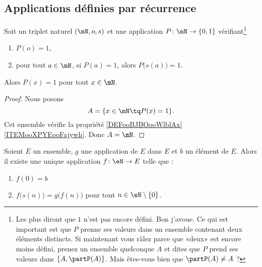 \subsection{Applications définies par récurrence}

\begin{proposition}      \label{PROPooXTRCooKwrWkq}
    Soit un triplet naturel \( (\mN,o,s)\) et une application \( P\colon \mN\to \{ 0,1 \}\) vérifiant\footnote{Les plus  diront que \( 1\) n'est pas encore défini. Bon j'avoue. Ce qui est important est que \( P\) prenne ses valeurs dans un ensemble contenant deux éléments distincts. Si maintenant vous râlez parce que «deux» est encore moins défini, prenez un ensemble quelconque \( A\) et dites que \( P\) prend ses valeurs dans \( \{ A, \partP(A)\}\). Mais êtes-vous bien  que \( \partP(A)\neq A\) ?}
    \begin{enumerate}
        \item
            \( P(o)=1\),
        \item
            pour tout \( a\in \mN\), si \( P(a)=1\), alors \( P\big( s(a) \big)=1\).
    \end{enumerate}
    Alors \( P(x)=1\) pour tout \( x\in \mN\).
\end{proposition}

\begin{proof}
    Nous posons 
    \begin{equation}
        A=\{ x\in\mN\tq P(x)=1 \}.
    \end{equation}
    Cet ensemble vérifie la propriété \ref{DEFooBJBOooWlblAx}\ref{ITEMooXPYEooFajywh}. Donc \( A=\mN\).
\end{proof}



\begin{theorem}       \label{THOooEJPYooZFVnez}
    Soient $E$ un ensemble, $g$ une application de $E$ dans $E$ et $b$ un élément de $E$.  Alors il existe une unique application \( f\colon \eN\to E\) telle que :
    \begin{enumerate}
        \item
            \( f(0)=b\)
        \item
            \( f\big( s(n) \big)=g\big( f(n) \big)\) pour tout \( n\in \eN\setminus\{ 0 \}\).
    \end{enumerate}
\end{theorem}

